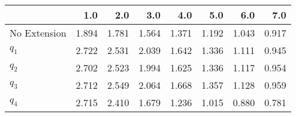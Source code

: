 \begin{tabular}{lrrrrrrr}
\toprule
{} &   1.0 &   2.0 &   3.0 &   4.0 &   5.0 &   6.0 &   7.0 \\
\midrule
No Extension & 1.894 & 1.781 & 1.564 & 1.371 & 1.192 & 1.043 & 0.917 \\
$q_1$        & 2.722 & 2.531 & 2.039 & 1.642 & 1.336 & 1.111 & 0.945 \\
$q_2$        & 2.702 & 2.523 & 1.994 & 1.625 & 1.336 & 1.117 & 0.954 \\
$q_3$        & 2.712 & 2.549 & 2.064 & 1.668 & 1.357 & 1.128 & 0.959 \\
$q_4$        & 2.715 & 2.410 & 1.679 & 1.236 & 1.015 & 0.880 & 0.781 \\
\bottomrule
\end{tabular}
